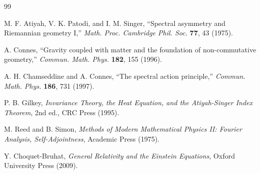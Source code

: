\documentclass[12pt]{article}
\begin{document}

\begin{thebibliography}{99}

M. F. Atiyah, V. K. Patodi, and I. M. Singer, ``Spectral asymmetry and Riemannian geometry I,'' \textit{Math. Proc. Cambridge Phil. Soc.} \textbf{77}, 43 (1975).

A. Connes, ``Gravity coupled with matter and the foundation of non-commutative geometry,'' \textit{Commun. Math. Phys.} \textbf{182}, 155 (1996).

A. H. Chamseddine and A. Connes, ``The spectral action principle,'' \textit{Commun. Math. Phys.} \textbf{186}, 731 (1997).

P. B. Gilkey, \textit{Invariance Theory, the Heat Equation, and the Atiyah-Singer Index Theorem}, 2nd ed., CRC Press (1995).

M. Reed and B. Simon, \textit{Methods of Modern Mathematical Physics II: Fourier Analysis, Self-Adjointness}, Academic Press (1975).

Y. Choquet-Bruhat, \textit{General Relativity and the Einstein Equations}, Oxford University Press (2009).

\end{thebibliography}
\end{document}
